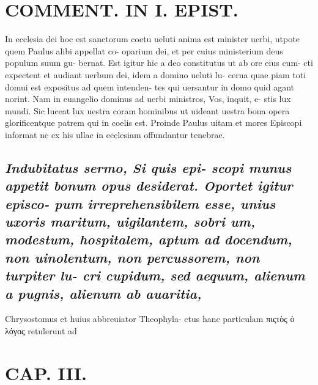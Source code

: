 \documentclass{article}
\begin{document}
\begin{pages}
\section*{COMMENT. IN I. EPIST. }\pstart In ecclesia dei hoc est sanctorum coetu ueluti anima est minister uerbi, utpote quem Paulus alibi appellat co- oparium dei, et per cuius ministerium deus populum suum gu- bernat. Est igitur hic a deo constitutus ut ab ore eius cum- cti expectent et audiant uerbum dei, idem a domino ueluti lu- cerna quae piam toti domui est expositus ad quem intenden- tes qui uersantur in domo quid agant norint. Nam in euangelio dominus ad uerbi ministros, Vos, inquit, e- stis lux mundi. Sic luceat lux uestra coram hominibus ut uideant uestra bona opera glorificentque patrem qui in coelis est. Proinde Paulus uitam et mores Episcopi informat ne ex his ullae in ecclesiam offundantur tenebrae.  \pend 
{}
{}
\subsection*{\textit{Indubitatus sermo, Si quis epi- scopi munus appetit bonum opus desiderat. Oportet igitur episco- pum irreprehensibilem esse, unius uxoris maritum, uigilantem, sobri um, modestum, hospitalem, aptum ad docendum, non uinolentum, non percussorem, non turpiter lu- cri cupidum, sed aequum, alienum a pugnis, alienum ab auaritia, }}\pstart Chrysostomus et huius abbreuiator Theophyla- ctus hanc particulam πιςτὸς ὁ λόγος retulerunt ad  \pend
\endnumbering
\beginnumbering
\section{CAP. III. }
\pstart
\pend
\endnumbering
\end{pages}
\end{document}
